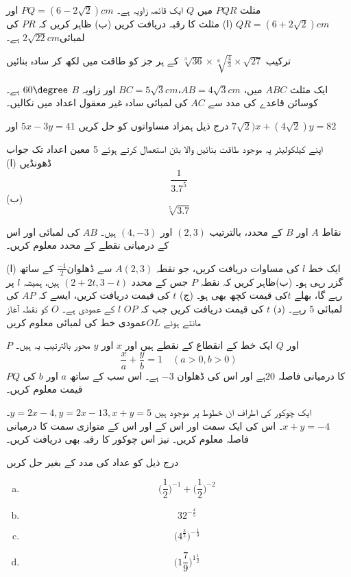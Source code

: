 مثلث \(PQR\) میں \(Q\) ایک قائمہ زاویہ ہے۔ \(PQ=(6-2\sqrt{2})cm\) اور \(QR=(6+2\sqrt{2})cm\)
(ا) مثلث کا رقبہ دریافت کریں
(ب) ظاہر کریں کہ \(PR\) کی لمبائی\(2\sqrt{22}cm\) ہے۔

ترکیب \(\sqrt[3]{36}\times\sqrt[6]{\frac{4}{3}}\times\sqrt{27}\)
 کے ہر جز کو طاقت میں لکھ کر سادہ بنائیں

ایک مثلث \(ABC\) میں، \(AB=4\sqrt{3}cm\)،\(BC=5\sqrt{3}cm\) اور زاویہ \(B\) \(60\degree\) ہے۔ کوسائن قاعدے کی مدد سے \(AC\) کی لمبائی سادہ غیر معقول اعداد میں نکالیں۔

درج ذیل ہمزاد مساواتوں کو حل کریں
\(5x-3y=41\) اور \(7\sqrt{2})x+(4\sqrt{2})y=82\)

اپنے کیلکولیٹر پہ موجود طاقت بنائیں والا بٹن استعمال کرتے ہوئے 5 معین اعداد تک جواب ڈھونڈیں
(ا) \[\frac{1}{3.7^{5}}\]
(ب) \[\sqrt[5]{3.7}\]

نقاط \(A\) اور \(B\) کے محدد، بالترتیب \((2,3)\) اور
\((4,-3)\) ہیں۔ \(AB\) کی لمبائی اور اس کے درمیانی نقطے کے محدد معلوم کریں۔

(ا) ایک خط \(l\) کی مساوات دریافت کریں، جو نقطہ \(A(2,3)\) سے ڈھلوان\(\frac{-1}{2}\) کے ساتھ گزر رہی ہو۔
(ب)ظاہر کریں کہ نقطہ \(P\) جس کے محدد \((2+2t,3-t)\) ہیں، ہمیشہ \(l\) پر رہے گا، بھلے \(t\)کی قیمت کچھ بھی ہو۔
(ج) \(t\) کی قیمت دریافت کریں، ایسے کہ \(AP\) کی لمبائی \(5\) رہے۔
(د) \(t\) کی قیمت دریافت کریں جب کہ \(OP\) \(l\) کے عمودی ہے۔ \(O\) کو نقطہ آغاز مانتے ہوئے \(OL\)عمودی خط کی لمبائی معلوم کریں



\(P\) اور \(Q\) ایک خط کے انقطاع کے نقطے ہیں
اور \(x\) اور \(y\) محور بالترتیب یہ ہیں۔
\[\frac{x}{a}+\frac{y}{b}=1\quad(a>0,b>0)\]
\(PQ\) کا درمیانی فاصلہ \(20\)ہے اور اس کی ڈھلوان \(-3\) ہے۔ اس سب کے ساتھ \(a\) اور \(b\) کی قیمت معلوم کریں۔

ایک چوکور کی اطراف ان خطوط پر موجود ہیں \(y=2x-4, y=2x-13, x+y=5\)۔\(x+y=-4\)۔
اس کی ایک سمت اور اس کے اور اس کے متوازی سمت کا درمیانی فاصلہ معلوم کریں۔ نیز اس چوکور کا رقبہ بھی دریافت کریں۔

درج ذیل کو عداد کی مدد کے بغیر حل کریں
\begin{multicols}{4}
\begin{enumerate}[a.]
\item
\[\Big(\frac{1}{2}\Big)^{-1}+\Big(\frac{1}{2}\Big)^{-2}\]
\item
\[32^{-\frac{4}{5}}\]
\item
\[\Big(4^{\frac{3}{2}}\Big)^{-\frac{1}{3}}\]
\item
\[\Big(1\frac{7}{9}\Big)^{1\frac{1}{2}}\]
\end{enumerate}
\end{multicols}

